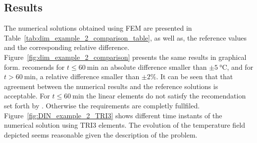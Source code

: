 \subsection{Results}

The numerical solutions obtained using FEM are presented in Table~\ref{tab:dim_example_2_comparison_table}, as well as, the reference values and the corresponding relative difference.
Figure~\ref{fig:dim_example_2_comparison} presents the same results in graphical form.
\cite{} recomends for \(t\leq \SI{60}{\minute}\) an absolute difference smaller than \(\pm \SI{5}{\celsius}\), and for \(t>\SI{60}{\minute}\), a relative difference smaller than \(\pm 2\%\).
It can be seen that that agreement between the numerical results and the reference solutions is acceptable.
For \(t\leq \SI{60}{\minute}\) the linear elements do not satisfy the recomendation set forth by \cite{}.
Otherwise the requirements are completly fullfiled.
Figure~\ref{fig:DIN_example_2_TRI3} shows different time instants of the numerical solution using TRI3 elements.
The evolution of the temperature field depicted seems reasonable given the description of the problem.

